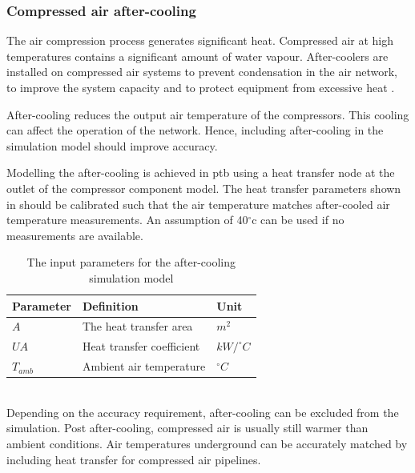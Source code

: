 		\subsubsection{Compressed air after-cooling}
		The air compression process generates significant heat. Compressed air at high temperatures contains a significant amount of water vapour. After-coolers are installed on compressed air systems to prevent condensation in the air network, to improve the system capacity and to protect equipment from excessive heat \cite{schroeder2009energy}.
		\par 
		After-cooling reduces the output air temperature of the compressors. This cooling can affect the operation of the network. Hence, including after-cooling in the simulation model should improve accuracy.
		\par
		Modelling the after-cooling is achieved in \gls{ptb} using a heat transfer node at the outlet of the compressor component model. The heat transfer parameters shown in  should be calibrated such that the air temperature matches after-cooled air temperature measurements. An assumption of 40$^\circ$\gls{c} can be used if no measurements are available. 
\\
		\begin{table}[h!]
			\caption{The input parameters for the after-cooling simulation model}
			\centering
			\begin{tabular}{lll}
				\hline 
				Parameter \hspace{1cm} & Definition \hspace{4cm} & Unit \\
				\hline
				$A$ & The heat transfer area & $m^2$ \\
				$UA$ & Heat transfer coefficient & $kW/^{\circ} C$ \\
				$T_{amb}$ & Ambient air temperature & $^{\circ} C$ \\
				\hline
			\end{tabular}
		\label{table: After cooling inputs}
		\end{table}
	\\
	Depending on the accuracy requirement, after-cooling can be excluded from the simulation. Post after-cooling, compressed air is usually still warmer than ambient conditions. Air temperatures underground can be accurately matched by including heat transfer for compressed air pipelines.
	
